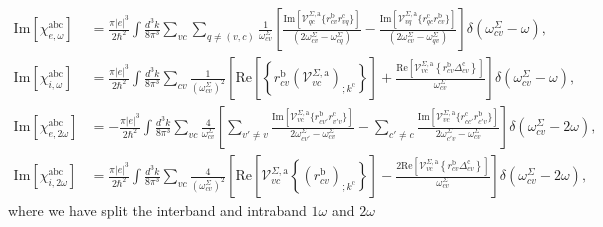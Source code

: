 \begin{equation}\label{eq:chis}
\begin{split}
\mathrm{Im}[\chi^{\mathrm{a}\mathrm{b}\mathrm{c}}_{e,\omega}]&= 
\frac{\pi |e|^3}{2\hbar^2}
\int \frac{d^{3}k}{8\pi^3}
\sum_{vc}\sum_{q\neq(v,c)}\frac{1}{\omega^\Sigma_{cv}}
\left[
\frac{\mathrm{Im}[\mathcal{V}^{\Sigma,\mathrm{a}}_{qc}
\{r^{\mathrm{b}}_{cv}r^{\mathrm{c}}_{vq}\}]}
{(2\omega^\Sigma_{cv}-\omega^\Sigma_{cq})} 
-\frac{\mathrm{Im}[\mathcal{V}^{\Sigma,\mathrm{a}}_{vq}
\{r^{\mathrm{c}}_{qc}r^{\mathrm{b}}_{cv}\}]}
{(2\omega^\Sigma_{cv}-\omega^\Sigma_{qv})}
\right]\delta(\omega^\Sigma_{cv}-\omega),\\
\mathrm{Im}[\chi^{\mathrm{a}\mathrm{b}\mathrm{c}}_{i,\omega}]&= 
\frac{\pi\vert e\vert^3}{2\hbar^2}
\int \frac{d^{3}k}{8\pi^3}
\sum_{cv}\frac{1}{(\omega^\Sigma_{cv})^{2}}
\left[
\mathrm{Re}\left[\left\{r^{\mathrm{b}}_{cv}
\left(\mathcal{V}^{\Sigma,\mathrm{a}}_{vc}\right)_{;k^{\mathrm{c}}}\right\}
\right]
+\frac{\mathrm{Re}\left[\mathcal{V}^{\Sigma,\mathrm{a}}_{vc}
\left\{r^{\mathrm{b}}_{cv}\Delta^{\mathrm{c}}_{cv}\right\}
\right]}{\omega^\Sigma_{cv}} 
\right]\delta(\omega^\Sigma_{cv}-\omega),\\
\mathrm{Im}[\chi^{\mathrm{a}\mathrm{b}\mathrm{c}}_{e,2\omega}]&= 
-\frac{\pi |e|^3}{2\hbar^2}
\int \frac{d^{3}k}{8\pi^3}
\sum_{vc}\frac{4}{\omega^\Sigma_{cv}}
\left[
\sum_{v'\ne
  v}\frac{\mathrm{Im}[\mathcal{V}^{\Sigma,\mathrm{a}}_{vc}
  \{r^{\mathrm{b}}_{cv'}r^{\mathrm{c}}_{v'v}\}]}
{2\omega^\Sigma_{cv'}-\omega^\Sigma_{cv}}
- \sum_{c'\ne
  c}\frac{\mathrm{Im}[\mathcal{V}^{\Sigma,\mathrm{a}}_{vc}
  \{r^{\mathrm{c}}_{cc'}r^{\mathrm{b}}_{c'v}\}]}
{2\omega^\Sigma_{c'v}-\omega^\Sigma_{cv}}
\right]\delta(\omega^\Sigma_{cv}-2\omega),\\
\mathrm{Im}[\chi^{\mathrm{a}\mathrm{b}\mathrm{c}}_{i,2\omega}]&= 
 \frac{\pi \vert
   e\vert^{3}}{2\hbar^2}
\int \frac{d^{3}k}{8\pi^3}
\sum_{vc}\frac{4}{(\omega^\Sigma_{cv})^{2}}
\left[\mathrm{Re}\left[\mathcal{V}^{\Sigma,\mathrm{a}}_{vc}
\left\{\left(r^{\mathrm{b}}_{cv}\right)_{;k^{\mathrm{c}}}
\right\}\right] -
\frac{2\mathrm{Re}\left[\mathcal{V}^{\Sigma,\mathrm{a}}_{vc}
\left\{r^{\mathrm{b}}_{cv}\Delta^{\mathrm{c}}_{cv}\right\}\right]}
{\omega^\Sigma_{cv}}\right]\delta(\omega^\Sigma_{cv}-2\omega),
\end{split}
\end{equation}
where we have split the interband and intraband $1\omega$ and $2\omega$
